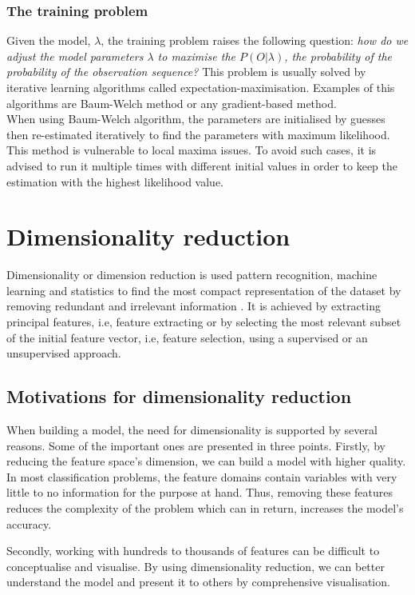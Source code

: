 \subsubsection{The training problem}
Given the model, \(\lambda\), the training problem raises the following question: \textit{how do we adjust the model parameters \(\lambda\) to maximise the \(P(O|\lambda)\), the probability of the probability of the observation sequence?}
This problem is usually solved by iterative learning algorithms called expectation-maximisation. Examples of this algorithms are Baum-Welch method or any gradient-based method. \cite{tuto1989} \cite{tool2001} \cite{biol1998}
\\When using Baum-Welch algorithm, the parameters are initialised by guesses then re-estimated iteratively to find the parameters with maximum likelihood.
This method is vulnerable to local maxima issues. To avoid such cases, it is advised to run it multiple times with different initial values in order to keep the estimation with the highest likelihood value.

\section{Dimensionality reduction}
Dimensionality or dimension reduction is used pattern recognition, machine learning and statistics to find the most compact representation of the dataset by removing redundant and irrelevant information \cite{effi2016}.
It is achieved by extracting principal features, i.e, feature extracting or by selecting the most relevant subset of the initial feature vector, i.e, feature selection, using a supervised or an unsupervised approach.

\subsection{Motivations for dimensionality reduction}
When building a model, the need for dimensionality is supported by several reasons. Some of the important ones are presented in three points.
Firstly, by reducing the feature space's dimension, we can build a model with higher quality\cite{newh2016}.
In most classification problems, the feature domains contain variables with very little to no information for the purpose at hand.
Thus, removing these features reduces the complexity of the problem which can in return, increases the model's accuracy.

Secondly, working with hundreds to thousands of features can be difficult to conceptualise and visualise. By using dimensionality reduction, we can better understand the model and present it to others by comprehensive visualisation\cite{newh2016}.

